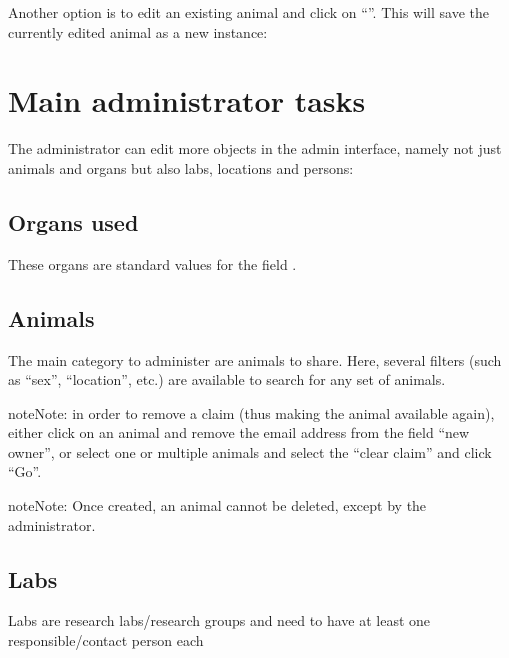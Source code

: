 \documentclass[letterpaper,10pt,openany,oneside,english]{sphinxmanual}
\begin{document}
\noindent{}

Another option is to edit an existing animal and click on “”. This will save the
currently edited animal as a new instance:

\noindent{}


\section{Main administrator tasks}
\label{\detokenize{index:main-administrator-tasks}}
The administrator can edit more objects in the admin interface, namely not just animals and organs
but also labs, locations and persons:

\noindent{}


\subsection{Organs used}
\label{\detokenize{index:organs-used}}
These organs are standard values for the field .


\subsection{Animals}
\label{\detokenize{index:id5}}
The main category to administer are animals to share.
Here, several filters (such as “sex”, “location”, etc.) are available to search for any set of animals.

\noindent{}

\begin{sphinxadmonition}{note}{Note:}
in order to remove a claim (thus making the animal available again), either click on an animal
and remove the email address from the field “new owner”, or select one or multiple animals and
select the “clear claim”  and click “Go”.
\end{sphinxadmonition}

\begin{sphinxadmonition}{note}{Note:}
Once created, an animal cannot be deleted, except by the administrator.
\end{sphinxadmonition}


\subsection{Labs}
\label{\detokenize{index:labs}}
Labs are research labs/research groups and need to have at least one responsible/contact person each
\end{document}
